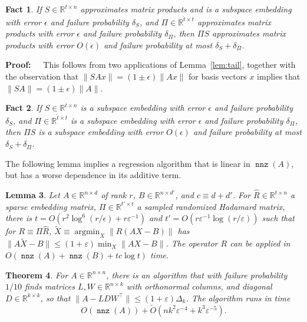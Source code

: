 \documentclass{sig-alternate}
\newcommand{\norm}[1]{{\| #1 \|}}
\DeclareMathOperator{\nnz}{\mathtt{nnz}}
\DeclareMathOperator{\argmin}{\mathrm{argmin}}
\newcommand{\ZZ}{S}
\newcommand{\eps}{\varepsilon}
\newcommand{\R}{{\mathbb R}}
\newtheorem{theorem}{Theorem}
\newtheorem{lemma}[theorem]{Lemma}
\newtheorem{fact}[theorem]{Fact}
\def\FullBox{\hbox{\vrule width 8pt height 8pt depth 0pt}}
\def\qed{\ifmmode\qquad\FullBox\else{\unskip\nobreak\hfil
\penalty50\hskip1em\null\nobreak\hfil\FullBox
\parfillskip=0pt\finalhyphendemerits=0\endgraf}\fi}
\newenvironment{proof}{\begin{trivlist} \item {\bf Proof:~~}}
  {\qed\end{trivlist}}
\begin{document}
\begin{fact}\label{fact:prod compose}
If $\ZZ \in \R^{t\times n}$ approximates matrix products and is a subspace
embedding with error $\epsilon$
and failure probability $\delta_\ZZ $,
and $\Pi\in \R^{\hat t\times t}$ approximates matrix products with error $\epsilon$
and failure probability $\delta_\Pi$,
then $\Pi \ZZ $ approximates matrix products with error $O(\epsilon)$
and failure probability at most $\delta_\ZZ  + \delta_\Pi$.
\end{fact}

\begin{proof}
This follows from two applications of Lemma~\ref{lem:tail}, together with
the observation that $\norm{\ZZ Ax} = (1\pm\epsilon)\norm{Ax}$ for basis vectors
$x$ implies that $\norm{\ZZ A} = (1\pm\epsilon)\norm{A}$.
\end{proof}

\begin{fact}\label{fact:embed compose}
If $\ZZ \in \R^{t\times n}$ is a subspace embedding with error $\epsilon$
and failure probability $\delta_\ZZ $,
and $\Pi\in \R^{\hat t\times t}$ is a subspace embedding with error $\epsilon$
and failure probability $\delta_\Pi$,
then $\Pi \ZZ $ is a subspace embedding with error $O(\epsilon)$
and failure probability at most $\delta_\ZZ  + \delta_\Pi$.
\end{fact}


The following lemma implies a regression algorithm that is
linear in $\nnz(A)$, but has a worse dependence in
its additive term.

\begin{lemma}\label{lem:genReg sparse}
Let $A\in \R^{n\times d}$ of rank $r$, $B\in \R^{n\times d'}$, 
and $c\equiv d+d'$.
For $\hat R\in \R^{t\times n}$ a sparse embedding matrix,
$\Pi\in \R^{t'\times t}$ a sampled randomized Hadamard matrix,
there is $t=O(r^2\log^6(r/\epsilon) + r\eps^{-1})$ and
$t'=O(r\eps^{-1}\log(r/\eps))$ such that
for $R\equiv \Pi \hat R$,
$\tilde X \equiv \argmin_X\norm{R(AX-B)}$ has
$\norm{A\tilde X - B}\le (1+\eps)\min_X\norm{AX-B}$.
The operator $R$ can be applied in $O(\nnz(A)+\nnz(B) + tc\log t)$ time.
\end{lemma}



\begin{theorem}\label{thm:SVD}
For $A\in\R^{n\times n}$, there is an algorithm that with failure
probability $1/10$ finds matrices $L,W\in \R^{n\times k}$
with orthonormal columns,
and diagonal $D \in\R^{k\times k}$, so that
$\norm{A-LDW^\top} \le (1+\eps)\Delta_k$.
The algorithm runs in time
\[
O(\nnz(A)) + \tilde O(nk^2\eps^{-4} + k^3\eps^{-5}).
\]
\end{theorem}
\end{document}
